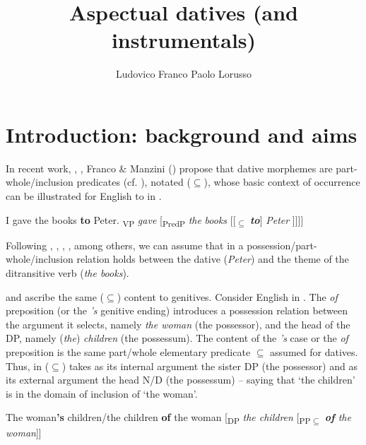 \documentclass[output=paper,modfonts,nonflat,newtxmath,colorlinks,citecolor=brown]{langsci/langscibook}
\author{Ludovico Franco\affiliation{Università di Firenze}\lastand 
Paolo Lorusso\affiliation{Istituto Universitario Studi Superiori (IUSS) Pavia }}
\title{Aspectual datives (and instrumentals)}
\begin{document}
\maketitle



\section{Introduction: background and aims}
\label{sec:franco:1}

In recent work, \citet{ManziniSavoia2011}, \citet{ManziniFranco2016}, Franco \& Manzini (\citeyear{FrancoManzini2017Gen, FrancoManzini2017Ins}) propose that dative morphemes are part-whole/inclusion predicates (cf.  \citealt{BelvinDenDikken1997}), notated (${\subseteq}$), whose basic context of occurrence can be illustrated for English {to} in .

\ea%
    \label{ex:franco:1}
    \ea I gave the books \textbf{to} Peter.
   \ex  {[}\textsubscript{VP} \textit{gave} [\textsubscript{PredP} \textit{the} \textit{books} [[\textsubscript{${\subseteq}$} \textbf{\textit{to}}] \textit{Peter} ]{]]]}
   \z
    \z

Following \citet{Kayne1984}, \citet{Pesetsky1995}, \citet{BeckJohnson2004}, \citet{Harley2002}, among others, we can assume that in  a possession/part-whole/inclusion relation holds between the dative (\textit{Peter}) and the theme of the ditransitive verb (\textit{the books}). 

\citet{ManziniSavoia2011, ManziniFranco2016} and \citet{FrancoManzini2017Gen} ascribe the same (${\subseteq}$) content to genitives. Consider English in . The \textit{of} preposition (or the \textit{’s} genitive ending) introduces a possession relation between the argument it selects, namely \textit{the woman} (the possessor), and the head of the DP, namely (\textit{the}) \textit{children} (the possessum). The content of the \textit{’s} case or the \textit{of} preposition is the same part/whole elementary predicate ${\subseteq}$ assumed for datives. Thus, in  (${\subseteq}$) takes as its internal argument the sister DP (the possessor) and as its external argument the head N/D (the possessum) – saying that ‘the children’ is in the domain of inclusion of ‘the woman’. 

\ea%
    \label{ex:franco:2}
    \ea \label{ex:franco:2a}The woman\textbf{’s} children/the children \textbf{of} the woman
    \ex \label{ex:franco:2b}{[}\textsubscript{DP} \textit{the children} [\textsubscript{PP${\subseteq}$} \textit{\textbf{of} the woman}{]]} 
    \z
    \z
\end{document}
